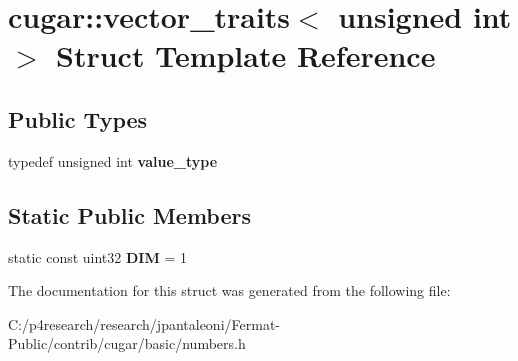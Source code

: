 \hypertarget{structcugar_1_1vector__traits_3_01unsigned_01int_01_4}{}\section{cugar\+:\+:vector\+\_\+traits$<$ unsigned int $>$ Struct Template Reference}
\label{structcugar_1_1vector__traits_3_01unsigned_01int_01_4}
\subsection*{Public Types}
\begin{DoxyCompactItemize}
\item 
\mbox{\label{structcugar_1_1vector__traits_3_01unsigned_01int_01_4_a76e3d7542b56ecf01b4c67233c4faa03}} 
typedef unsigned int {\bfseries value\+\_\+type}
\end{DoxyCompactItemize}
\subsection*{Static Public Members}
\begin{DoxyCompactItemize}
\item 
\mbox{\label{structcugar_1_1vector__traits_3_01unsigned_01int_01_4_a7e80cee460862c2cc359ac7fcaebfe49}} 
static const uint32 {\bfseries D\+IM} = 1
\end{DoxyCompactItemize}


The documentation for this struct was generated from the following file\+:\begin{DoxyCompactItemize}
\item 
C\+:/p4research/research/jpantaleoni/\+Fermat-\/\+Public/contrib/cugar/basic/numbers.\+h\end{DoxyCompactItemize}

